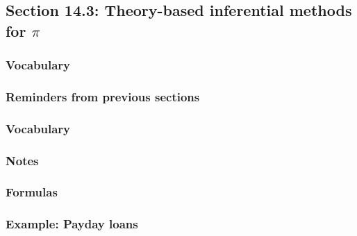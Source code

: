 \documentclass[
]{report}
\begin{document}
\hypertarget{section-14.3-theory-based-inferential-methods-for-pi}{%
\subsection*{\texorpdfstring{Section 14.3: Theory-based inferential methods for \(\pi\)}{Section 14.3: Theory-based inferential methods for \textbackslash pi}}\label{section-14.3-theory-based-inferential-methods-for-pi}}

\hypertarget{vocabulary-13}{%
\subsubsection*{Vocabulary}\label{vocabulary-13}}

\hypertarget{reminders-from-previous-sections-5}{%
\subsubsection*{Reminders from previous sections}\label{reminders-from-previous-sections-5}}

\hypertarget{vocabulary-14}{%
\subsubsection*{Vocabulary}\label{vocabulary-14}}

\hypertarget{notes-18}{%
\subsubsection*{Notes}\label{notes-18}}

\hypertarget{formulas-1}{%
\subsubsection*{Formulas}\label{formulas-1}}

\hypertarget{example-payday-loans}{%
\subsubsection*{Example: Payday loans}\label{example-payday-loans}}
\end{document}
